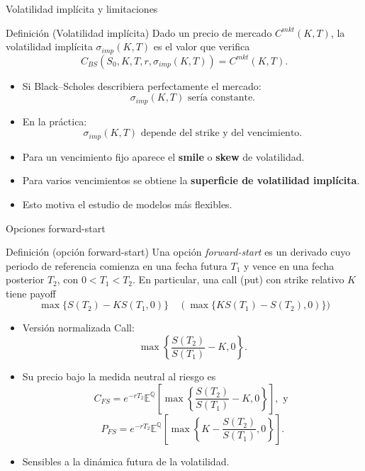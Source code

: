 \documentclass[8pt]{beamer}
\begin{document}
\begin{frame}{Volatilidad implícita y limitaciones}

\begin{block}{Definición (Volatilidad implícita)}
Dado un precio de mercado $C^{mkt}(K,T)$, la volatilidad implícita 
$\sigma_{imp}(K,T)$ es el valor que verifica
\[
    C_{BS}(S_0,K,T,r,\sigma_{imp}(K,T))=C^{mkt}(K,T).
\]
\end{block}
\pause
\begin{itemize}
    \item Si Black--Scholes describiera perfectamente el mercado:
    \[
        \sigma_{imp}(K,T) \text{ sería constante.}
    \]

    \item En la práctica:
    \[
        \sigma_{imp}(K,T) \text{ depende del strike y del vencimiento.}
    \]

    \item Para un vencimiento fijo aparece el \textbf{smile} o \textbf{skew} de volatilidad.

    \item Para varios vencimientos se obtiene la \textbf{superficie de volatilidad implícita}.

    \item Esto motiva el estudio de modelos más flexibles.
\end{itemize}

\end{frame}

\begin{frame}{Opciones forward-start}
    \begin{block}{Definición (opción forward-start)}
        Una opción \textit{forward-start} es un derivado cuyo periodo de referencia comienza en una fecha futura $T_1$ y vence en una fecha posterior $T_2$, con $0<T_1<T_2$. En particular, una call (put) con strike relativo $K$ tiene payoff
        \[
            \max\{S(T_2)-KS(T_1,0)\}\quad (\max\{KS(T_1)-S(T_2),0)\})
        \]
    \end{block}
    \pause
    \begin{itemize}
    

        \item Versión normalizada Call:
        \[
            \max\left\{\frac{S(T_2)}{S(T_1)}-K,0\right\}.
        \]

        \item Su precio bajo la medida neutral al riesgo es
        \[
            C_{FS}=e^{-rT_2}
            \mathbb{E}^{\mathbb Q}\left[
            \max\left\{\frac{S(T_2)}{S(T_1)}-K,0\right\}
            \right], \text{ y }
        \]
        \[
            P_{FS}=e^{-rT_2}
            \mathbb{E}^{\mathbb Q}\left[
            \max\left\{K-\frac{S(T_2)}{S(T_1)},0\right\}
            \right].
        \]

        \item Sensibles a la dinámica futura de la volatilidad.
    \end{itemize}

\end{frame}
\end{document}
